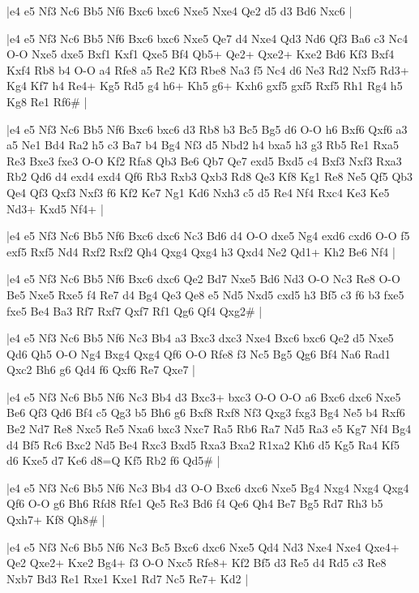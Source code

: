 \whitename{}
\blackname{}
\makegametitle
|e4 e5 Nf3 Nc6 Bb5 Nf6 Bxc6 bxc6 Nxe5 Nxe4 Qe2 d5 d3 Bd6 Nxc6  |

\whitename{}
\blackname{}
\makegametitle
|e4 e5 Nf3 Nc6 Bb5 Nf6 Bxc6 bxc6 Nxe5 Qe7 d4 Nxe4 Qd3 Nd6 Qf3 Ba6 c3 Nc4 O-O Nxe5 dxe5 Bxf1 Kxf1 Qxe5 Bf4 Qb5+ Qe2+ Qxe2+ Kxe2 Bd6 Kf3 Bxf4 Kxf4 Rb8 b4 O-O a4 Rfe8 a5 Re2 Kf3 Rbe8 Na3 f5 Nc4 d6 Ne3 Rd2 Nxf5 Rd3+ Kg4 Kf7 h4 Re4+ Kg5 Rd5 g4 h6+ Kh5 g6+ Kxh6 gxf5 gxf5 Rxf5 Rh1 Rg4 h5 Kg8 Re1 Rf6\#  |

\whitename{}
\blackname{}
\makegametitle
|e4 e5 Nf3 Nc6 Bb5 Nf6 Bxc6 bxc6 d3 Rb8 b3 Bc5 Bg5 d6 O-O h6 Bxf6 Qxf6 a3 a5 Ne1 Bd4 Ra2 h5 c3 Ba7 b4 Bg4 Nf3 d5 Nbd2 h4 bxa5 h3 g3 Rb5 Re1 Rxa5 Re3 Bxe3 fxe3 O-O Kf2 Rfa8 Qb3 Be6 Qb7 Qe7 exd5 Bxd5 c4 Bxf3 Nxf3 Rxa3 Rb2 Qd6 d4 exd4 exd4 Qf6 Rb3 Rxb3 Qxb3 Rd8 Qe3 Kf8 Kg1 Re8 Ne5 Qf5 Qb3 Qe4 Qf3 Qxf3 Nxf3 f6 Kf2 Ke7 Ng1 Kd6 Nxh3 c5 d5 Re4 Nf4 Rxc4 Ke3 Ke5 Nd3+ Kxd5 Nf4+  |

\whitename{}
\blackname{}
\makegametitle
|e4 e5 Nf3 Nc6 Bb5 Nf6 Bxc6 dxc6 Nc3 Bd6 d4 O-O dxe5 Ng4 exd6 cxd6 O-O f5 exf5 Rxf5 Nd4 Rxf2 Rxf2 Qh4 Qxg4 Qxg4 h3 Qxd4 Ne2 Qd1+ Kh2 Be6 Nf4  |

\whitename{}
\blackname{}
\makegametitle
|e4 e5 Nf3 Nc6 Bb5 Nf6 Bxc6 dxc6 Qe2 Bd7 Nxe5 Bd6 Nd3 O-O Nc3 Re8 O-O Be5 Nxe5 Rxe5 f4 Re7 d4 Bg4 Qe3 Qe8 e5 Nd5 Nxd5 cxd5 h3 Bf5 c3 f6 b3 fxe5 fxe5 Be4 Ba3 Rf7 Rxf7 Qxf7 Rf1 Qg6 Qf4 Qxg2\#  |

\whitename{}
\blackname{}
\makegametitle
|e4 e5 Nf3 Nc6 Bb5 Nf6 Nc3 Bb4 a3 Bxc3 dxc3 Nxe4 Bxc6 bxc6 Qe2 d5 Nxe5 Qd6 Qh5 O-O Ng4 Bxg4 Qxg4 Qf6 O-O Rfe8 f3 Nc5 Bg5 Qg6 Bf4 Na6 Rad1 Qxc2 Bh6 g6 Qd4 f6 Qxf6 Re7 Qxe7  |

\whitename{}
\blackname{}
\makegametitle
|e4 e5 Nf3 Nc6 Bb5 Nf6 Nc3 Bb4 d3 Bxc3+ bxc3 O-O O-O a6 Bxc6 dxc6 Nxe5 Be6 Qf3 Qd6 Bf4 c5 Qg3 b5 Bh6 g6 Bxf8 Rxf8 Nf3 Qxg3 fxg3 Bg4 Ne5 b4 Rxf6 Be2 Nd7 Re8 Nxc5 Re5 Nxa6 bxc3 Nxc7 Ra5 Rb6 Ra7 Nd5 Ra3 e5 Kg7 Nf4 Bg4 d4 Bf5 Rc6 Bxc2 Nd5 Be4 Rxc3 Bxd5 Rxa3 Bxa2 R1xa2 Kh6 d5 Kg5 Ra4 Kf5 d6 Kxe5 d7 Ke6 d8=Q Kf5 Rb2 f6 Qd5\#  |

\whitename{}
\blackname{}
\makegametitle
|e4 e5 Nf3 Nc6 Bb5 Nf6 Nc3 Bb4 d3 O-O Bxc6 dxc6 Nxe5 Bg4 Nxg4 Nxg4 Qxg4 Qf6 O-O g6 Bh6 Rfd8 Rfe1 Qe5 Re3 Bd6 f4 Qe6 Qh4 Be7 Bg5 Rd7 Rh3 b5 Qxh7+ Kf8 Qh8\#  |

\whitename{}
\blackname{}
\makegametitle
|e4 e5 Nf3 Nc6 Bb5 Nf6 Nc3 Bc5 Bxc6 dxc6 Nxe5 Qd4 Nd3 Nxe4 Nxe4 Qxe4+ Qe2 Qxe2+ Kxe2 Bg4+ f3 O-O Nxc5 Rfe8+ Kf2 Bf5 d3 Re5 d4 Rd5 c3 Re8 Nxb7 Bd3 Re1 Rxe1 Kxe1 Rd7 Nc5 Re7+ Kd2  |

